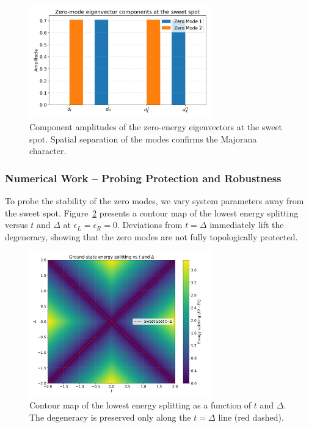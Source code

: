 \documentclass[11pt, letterpaper, titlepage]{article}
\begin{document}
\begin{figure}[htbp]
  \centering
  \includegraphics[width=0.7\textwidth]{../Figures/singlebody_sweetspot_zero_modes.png}
  \caption{Component amplitudes of the zero-energy eigenvectors at the sweet spot. Spatial separation of the modes confirms the Majorana character.}
  \label{fig:sb_zero_modes}
\end{figure}

\subsubsection{Numerical Work – Probing Protection and Robustness}

To probe the stability of the zero modes, we vary system parameters away from the sweet spot. Figure~\ref{fig:sb_grid} presents a contour map of the lowest energy splitting versus $t$ and $\Delta$ at $\epsilon_L = \epsilon_R = 0$. Deviations from $t = \Delta$ immediately lift the degeneracy, showing that the zero modes are not fully topologically protected.

\begin{figure}[htbp]
  \centering
  \includegraphics[width=0.7\textwidth]{../Figures/singlebody_sweetspot_grid.png}
  \caption{Contour map of the lowest energy splitting as a function of $t$ and $\Delta$. The degeneracy is preserved only along the $t = \Delta$ line (red dashed).}
  \label{fig:sb_grid}
\end{figure}
\end{document}
